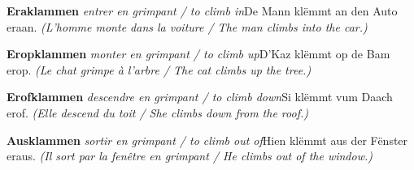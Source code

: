 \textbf{Eraklammen} \textit{entrer en grimpant / to climb in}\newline De Mann klëmmt an den Auto eraan. \textit{(L'homme monte dans la voiture / The man climbs into the car.)}

\textbf{Eropklammen} \textit{monter en grimpant / to climb up}\newline D'Kaz klëmmt op de Bam erop. \textit{(Le chat grimpe à l'arbre / The cat climbs up the tree.)}

\textbf{Erofklammen} \textit{descendre en grimpant / to climb down}\newline Si klëmmt vum Daach erof. \textit{(Elle descend du toit / She climbs down from the roof.)}

\textbf{Ausklammen} \textit{sortir en grimpant / to climb out of}\newline Hien klëmmt aus der Fënster eraus. \textit{(Il sort par la fenêtre en grimpant / He climbs out of the window.)}

